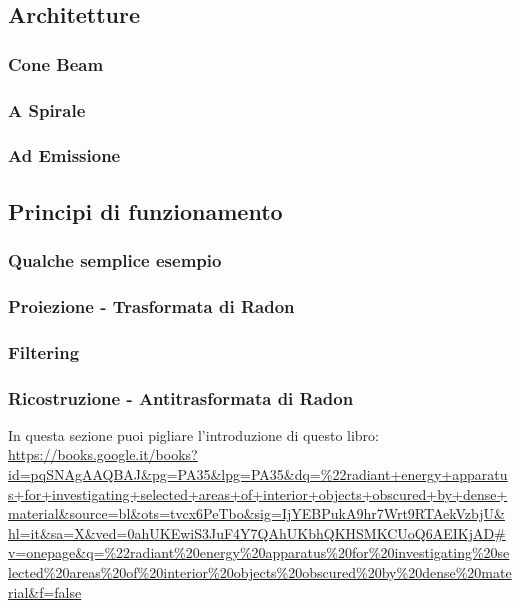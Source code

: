 \documentclass[a4paper,11pt, oneside]{article}
\begin{document}
            
            \subsection{Architetture}
                \subsubsection{Cone Beam}
                \subsubsection{A Spirale}
                \subsubsection{Ad Emissione}
            
            \subsection{Principi di funzionamento}
                \subsubsection{Qualche semplice esempio}

                \subsubsection{Proiezione - Trasformata di Radon}
                \subsubsection{Filtering}
                \subsubsection{Ricostruzione - Antitrasformata di Radon}
                    In questa sezione puoi pigliare l'introduzione di questo libro:
                    \url{https://books.google.it/books?id=pqSNAgAAQBAJ&pg=PA35&lpg=PA35&dq=%22radiant+energy+apparatus+for+investigating+selected+areas+of+interior+objects+obscured+by+dense+material&source=bl&ots=tvcx6PeTbo&sig=IjYEBPukA9hr7Wrt9RTAekVzbjU&hl=it&sa=X&ved=0ahUKEwiS3JuF4Y7QAhUKbhQKHSMKCUoQ6AEIKjAD#v=onepage&q=%22radiant%20energy%20apparatus%20for%20investigating%20selected%20areas%20of%20interior%20objects%20obscured%20by%20dense%20material&f=false}
\end{document}

